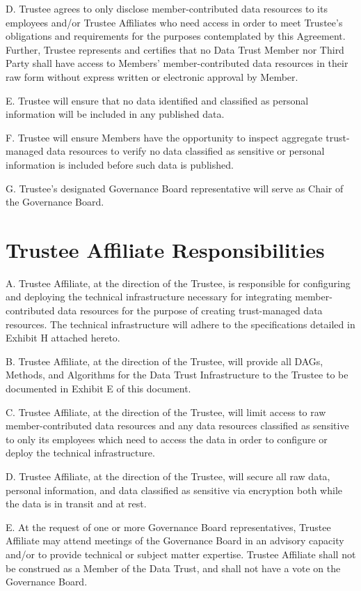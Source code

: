 \documentclass[]{book}
\begin{document}
D. Trustee agrees to only disclose member-contributed data resources to its employees and/or Trustee Affiliates who need access in order to meet Trustee's obligations and requirements for the purposes contemplated by this Agreement. Further, Trustee represents and certifies that no Data Trust Member nor Third Party shall have access to Members' member-contributed data resources in their raw form without express written or electronic approval by Member.

E. Trustee will ensure that no data identified and classified as personal information will be included in any published data.

F. Trustee will ensure Members have the opportunity to inspect aggregate trust-managed data resources to verify no data classified as sensitive or personal information is included before such data is published.

G. Trustee's designated Governance Board representative will serve as Chair of the Governance Board.

\hypertarget{trustee-affiliate-responsibilities}{%
\chapter{Trustee Affiliate Responsibilities}\label{trustee-affiliate-responsibilities}}

A. Trustee Affiliate, at the direction of the Trustee, is responsible for configuring and deploying the technical infrastructure necessary for integrating member-contributed data resources for the purpose of creating trust-managed data resources. The technical infrastructure will adhere to the specifications detailed in Exhibit H attached hereto.

B. Trustee Affiliate, at the direction of the Trustee, will provide all DAGs, Methods, and Algorithms for the Data Trust Infrastructure to the Trustee to be documented in Exhibit E of this document.

C. Trustee Affiliate, at the direction of the Trustee, will limit access to raw member-contributed data resources and any data resources classified as sensitive to only its employees which need to access the data in order to configure or deploy the technical infrastructure.

D. Trustee Affiliate, at the direction of the Trustee, will secure all raw data, personal information, and data classified as sensitive via encryption both while the data is in transit and at rest.

E. At the request of one or more Governance Board representatives, Trustee Affiliate may attend meetings of the Governance Board in an advisory capacity and/or to provide technical or subject matter expertise. Trustee Affiliate shall not be construed as a Member of the Data Trust, and shall not have a vote on the Governance Board.
\end{document}
